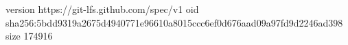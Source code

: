version https://git-lfs.github.com/spec/v1
oid sha256:5bdd9319a2675d4940771e96610a8015ccc6ef0d676aad09a97fd9d2246ad398
size 174916
